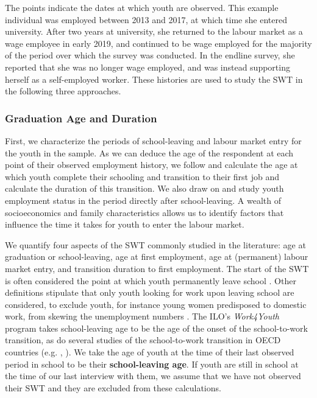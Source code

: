 \documentclass[
  a4paper, twoside, 12pt]{book}
\begin{document}
\begin{figure}[H]
\centering
{}
\end{figure}

The points indicate the dates at which youth are observed. This example individual was employed between 2013 and 2017, at which time she entered university. After two years at university, she returned to the labour market as a wage employee in early 2019, and continued to be wage employed for the majority of the period over which the survey was conducted. In the endline survey, she reported that she was no longer wage employed, and was instead supporting herself as a self-employed worker. These histories are used to study the SWT in the following three approaches.

\hypertarget{onset}{%
\subsubsection*{Graduation Age and Duration}\label{onset}}

First, we characterize the periods of school-leaving and labour market entry for the youth in the sample. As we can deduce the age of the respondent at each point of their observed employment history, we follow \textcite{manacorda2017} and calculate the age at which youth complete their schooling and transition to their first job and calculate the duration of this transition. We also draw on \textcite{bridges2017} and study youth employment status in the period directly after school-leaving. A wealth of socioeconomics and family characteristics allows us to identify factors that influence the time it takes for youth to enter the labour market.

We quantify four aspects of the SWT commonly studied in the literature: age at graduation or school-leaving, age at first employment, age at (permanent) labour market entry, and transition duration to first employment. The start of the SWT is often considered the point at which youth permanently leave school \autocite{bowers1998,nilsson2019}. Other definitions stipulate that only youth looking for work upon leaving school are considered, to exclude youth, for instance young women predisposed to domestic work, from skewing the unemployment numbers \autocite{matsumoto2010}. The ILO's \emph{Work4Youth} program takes school-leaving age to be the age of the onset of the school-to-work transition, as do several studies of the school-to-work transition in OECD countries (e.g. \textcite{bowers1998}, \textcite{quintini2007}). We take the age of youth at the time of their last observed period in school to be their \textbf{school-leaving age}. If youth are still in school at the time of our last interview with them, we assume that we have not observed their SWT and they are excluded from these calculations.
\end{document}
